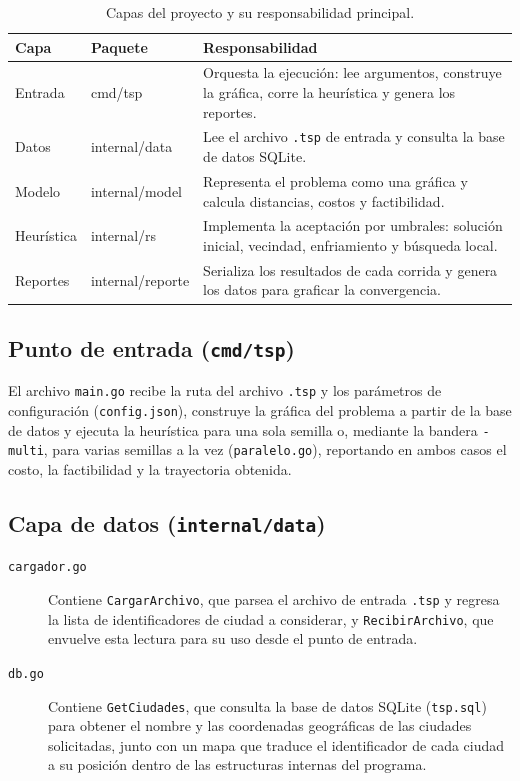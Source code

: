\documentclass[12pt,a4paper]{article}
\begin{document}
\begin{table}[H]
\centering
\small
\renewcommand{\arraystretch}{1.25}
\begin{tabular}{@{}>{\raggedright\arraybackslash}p{2.5cm} >{\ttfamily}p{3cm} p{7cm}@{}}
\toprule
\textbf{Capa} & \textbf{Paquete} & \textbf{Responsabilidad} \\
\midrule
Entrada & cmd/tsp & Orquesta la ejecución: lee argumentos, construye la gráfica, corre la heurística y genera los reportes. \\
Datos & internal/data & Lee el archivo \texttt{.tsp} de entrada y consulta la base de datos SQLite. \\
Modelo & internal/model & Representa el problema como una gráfica y calcula distancias, costos y factibilidad. \\
Heurística & internal/rs & Implementa la aceptación por umbrales: solución inicial, vecindad, enfriamiento y búsqueda local. \\
Reportes & internal/reporte & Serializa los resultados de cada corrida y genera los datos para graficar la convergencia. \\
\bottomrule
\end{tabular}
\caption{Capas del proyecto y su responsabilidad principal.}
\label{tab:capas}
\end{table}

\subsection{Punto de entrada (\texttt{cmd/tsp})}

El archivo \texttt{main.go} recibe la ruta del archivo \texttt{.tsp} y los parámetros de configuración (\texttt{config.json}), construye la gráfica del problema a partir de la base de datos y ejecuta la heurística para una sola semilla o, mediante la bandera \texttt{-multi}, para varias semillas a la vez (\texttt{paralelo.go}), reportando en ambos casos el costo, la factibilidad y la trayectoria obtenida.

\subsection{Capa de datos (\texttt{internal/data})}

\begin{description}
  \item[\texttt{cargador.go}] Contiene \texttt{CargarArchivo}, que parsea el archivo de entrada \texttt{.tsp} y regresa la lista de identificadores de ciudad a considerar, y \texttt{RecibirArchivo}, que envuelve esta lectura para su uso desde el punto de entrada.
  \item[\texttt{db.go}] Contiene \texttt{GetCiudades}, que consulta la base de datos SQLite (\texttt{tsp.sql}) para obtener el nombre y las coordenadas geográficas de las ciudades solicitadas, junto con un mapa que traduce el identificador de cada ciudad a su posición dentro de las estructuras internas del programa.
\end{description}
\end{document}
